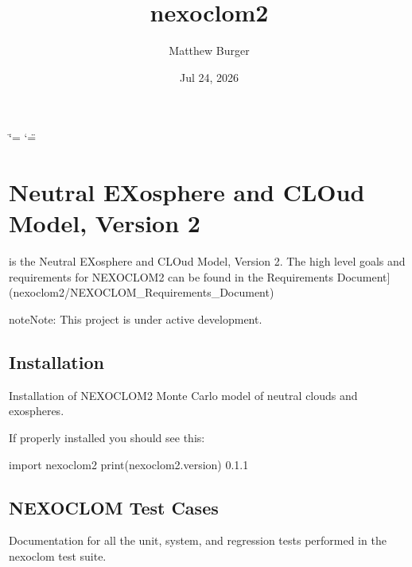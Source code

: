 \documentclass[letterpaper,10pt,english]{sphinxmanual}
\title{nexoclom2}
\date{Jul 24, 2026}
\author{Matthew Burger}
\begin{document}
\ifdefined\shorthandoff
  \ifnum\catcode`\=\string=\active\shorthandoff{=}\fi
  \ifnum\catcode`\"=\active{}\fi
\fi

\pagestyle{empty}
\sphinxmaketitle
\pagestyle{plain}
\sphinxtableofcontents
\pagestyle{normal}
\label{\detokenize{index::doc}}



\chapter{Neutral EXosphere and CLOud Model, Version 2}
\label{\detokenize{index:neutral-exosphere-and-cloud-model-version-2}}
\sphinxAtStartPar
{} is the Neutral EXosphere and CLOud Model, Version 2. The high
level goals and requirements for NEXOCLOM2 can be found in the
Requirements Document{]}(nexoclom2/NEXOCLOM\_Requirements\_Document)

\begin{sphinxadmonition}{note}{Note:}
\sphinxAtStartPar
This project is under active development.
\end{sphinxadmonition}

\sphinxstepscope


\section{Installation}
\label{\detokenize{nexoclom2/install:installation}}\label{\detokenize{nexoclom2/install::doc}}
\sphinxAtStartPar
Installation of NEXOCLOM2 Monte Carlo model of neutral clouds and exospheres.

\sphinxAtStartPar
If properly installed you should see this:

\begin{sphinxVerbatim}[commandchars=\\\{\}]
\PYGZgt{}\PYGZgt{}\PYGZgt{} import nexoclom2
\PYGZgt{}\PYGZgt{}\PYGZgt{} print(nexoclom2.\PYGZus{}\PYGZus{}version\PYGZus{}\PYGZus{})
0.1.1
\end{sphinxVerbatim}

\sphinxstepscope


\section{NEXOCLOM Test Cases}
\label{\detokenize{nexoclom2/TestCases:nexoclom-test-cases}}\label{\detokenize{nexoclom2/TestCases::doc}}
\sphinxAtStartPar
Documentation for all the unit, system, and regression tests performed in the nexoclom test suite.
\end{document}
